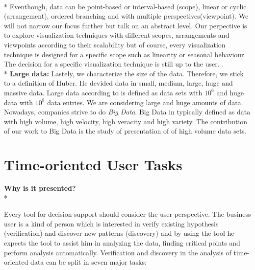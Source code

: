 \\*
Eventhough, data can be point-based or interval-based (scope), linear or cyclic (arrangement), ordered branching and with multiple perspectives(viewpoint)\cite{Aigner2011}. We will not narrow our focus further but talk on an abstract level. Our perpective is to explore visualization techniques with different scopes, arrangements and viewpoints according to their scalability but of course, every visualization technique is designed for a specific scope such as linearity or seasonal behaviour. The decision for a specific visualization technique is still up to the user. .\\*
\textbf{Large data:} Lastely, we characterize the size of the data. Therefore, we stick to a definition of Huber. He devided data in small, medium, large, huge and massive data. Large data according to\cite{Huber1994} is defined as data sets with $10^6$ and huge data with $10^8$ data entries. We are considering large and huge amounts of data. Nowadays, companies strive to do \textit{Big Data}. Big Data in typically defined as data with  high volume, high velocity, high veracity and high variety\cite{Wang2015}. The contribution of our work to Big Data is the study of presentation of of high volume data sets.



\section{Time-oriented User Tasks} \label{tasks}
\textbf{Why is it presented?}\\*

Every tool for decision-support should consider the user perspective. The business user is a kind of person which is interested in verify existing hypothesis (verification) and discover new patterns (discovery) and by using the tool he expects the tool to assist him in analyzing the data, finding critical points and perform analysis automatically\cite{Brachman1996}. Verification and discovery in the analysis of time-oriented data can be split in seven major tasks\cite{Esling2012}:

